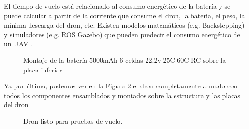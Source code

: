 \noindent El tiempo de vuelo está relacionado al consumo energético de la batería y se puede calcular a partir de la corriente que consume el dron, la batería, el peso, la mínima descarga del dron, etc. Existen modelos matemáticos (e.g. Backstepping) y simuladores (e.g. ROS Gazebo) que pueden predecir el consumo energético de un UAV \cite{videodron}.

\begin{figure}[H]
    \centering
    \quad
    \caption{Montaje de la batería 5000mAh 6 celdas 22.2v 25C-60C RC sobre la placa inferior.}
    \label{fig:bateria}
\end{figure}


\noindent Ya por último, podemos ver en la Figura \ref{fig:drone} el dron completamente armado con todos los componentes ensamblados y montados sobre la estructura y las placas del dron.

\begin{figure}[H]
    \centering
    \caption{Dron listo para pruebas de vuelo.}
    \label{fig:drone}
\end{figure}

